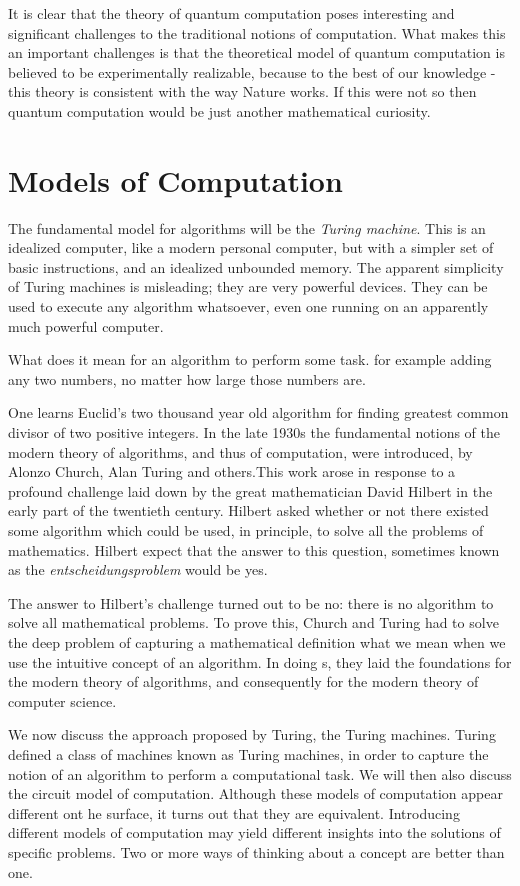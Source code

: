 \documentclass[12pt, oneside]{book}
\theoremstyle{definition}
\theoremstyle{definition}
\theoremstyle{remark}
\begin{document}
It is clear that the theory of quantum computation poses interesting and significant challenges to the traditional notions of computation. What makes this an important challenges is that the theoretical model of quantum computation is believed to be experimentally realizable, because to the best of our knowledge - this theory is consistent with the way Nature works. If this were not so then quantum computation would be just another mathematical curiosity.

\section{Models of Computation}
The fundamental model for algorithms will be the \textit{Turing machine}. This is an idealized computer, like a modern personal computer, but with a simpler set of basic instructions, and an idealized unbounded memory. The apparent simplicity of Turing machines is misleading; they are very powerful devices. They can be used to execute any algorithm whatsoever, even one running on an apparently much powerful computer.

What does it mean for an algorithm to perform some task. for example adding any two numbers, no matter how large those numbers are.

One learns Euclid's two thousand year old algorithm for finding greatest common divisor of two positive integers. In the late 1930s the fundamental notions of the modern theory of algorithms, and thus of computation, were introduced, by Alonzo Church, Alan Turing and others.This work arose in response to a profound challenge laid down by the great mathematician David Hilbert in the early part of the twentieth century. Hilbert asked whether or not there existed some algorithm which could be used, in principle, to solve all the problems of mathematics. Hilbert expect that the answer to this question, sometimes known as the \textit{entscheidungsproblem} would be yes.

The answer to Hilbert's challenge turned out to be no: there is no algorithm to solve all mathematical problems. To prove this, Church and Turing had to solve the deep problem of capturing a mathematical definition what we mean when we use the intuitive concept of an algorithm. In doing s, they laid the foundations for the modern theory of algorithms, and consequently for the modern theory of computer science.

We now discuss the approach proposed by Turing, the Turing machines. Turing defined a class of machines known as Turing machines, in order to capture the notion of an algorithm to perform a computational task. We will then also discuss the circuit model of computation. Although these models of computation appear different ont he surface, it turns out that they are equivalent. Introducing different models of computation may yield different insights into the solutions of specific problems. Two or more ways of thinking about a concept are better than one.
\end{document}
